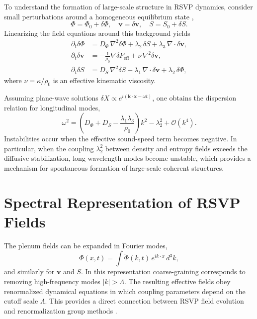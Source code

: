 \documentclass[12pt,a4paper]{article}
\theoremstyle{plain}
\theoremstyle{definition}
\theoremstyle{remark}
\begin{document}
To understand the formation of large-scale structure in RSVP dynamics,
consider small perturbations around a homogeneous equilibrium state
\cite{LandauFluid},
\begin{equation}
\Phi = \Phi_0 + \delta\Phi, \quad
\mathbf{v} = \delta\mathbf{v}, \quad
S = S_0 + \delta S.
\end{equation}
Linearizing the field equations around this background yields
\begin{align}
\partial_t \delta\Phi &=
D_\Phi\,\nabla^2 \delta\Phi + \lambda_2\,\delta S
+ \lambda_3\,\nabla \cdot \delta\mathbf{v}, \\
\partial_t \delta\mathbf{v} &=
-\frac{1}{\rho_0}\nabla\delta P_{\text{eff}}
+ \nu\,\nabla^2 \delta\mathbf{v}, \\
\partial_t \delta S &=
D_S\,\nabla^2 \delta S + \lambda_1\,\nabla \cdot \delta\mathbf{v}
+ \lambda_2\,\delta\Phi,
\end{align}
where $\nu = \kappa/\rho_0$ is an effective kinematic viscosity.

Assuming plane-wave solutions $\delta X \propto e^{i(\mathbf{k}\cdot\mathbf{x} - \omega t)}$,
one obtains the dispersion relation for longitudinal modes,
\begin{equation}
\omega^2 = \left(D_\Phi + D_S - \frac{\lambda_1\lambda_3}{\rho_0}\right)k^2
- \lambda_2^2 + \mathcal{O}(k^4).
\end{equation}
Instabilities occur when the effective sound-speed term becomes
negative. In particular, when the coupling $\lambda_2^2$ between density
and entropy fields exceeds the diffusive stabilization, long-wavelength
modes become unstable, which provides a mechanism for spontaneous
formation of large-scale coherent structures.

\section{Spectral Representation of RSVP Fields}

The plenum fields can be expanded in Fourier modes,
\begin{equation}
\Phi(x,t) = \int \tilde{\Phi}(k,t)\, e^{ik \cdot x}\, d^3k,
\end{equation}
and similarly for $\mathbf{v}$ and $S$. In this representation
coarse-graining corresponds to removing high-frequency modes $|k| > \Lambda$.
The resulting effective fields obey renormalized dynamical equations
in which coupling parameters depend on the cutoff scale $\Lambda$.
This provides a direct connection between RSVP field evolution and
renormalization group methods \cite{Wilson1974,Polchinski1984}.
\end{document}

